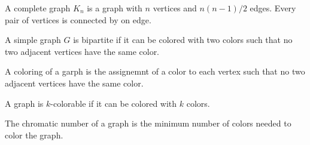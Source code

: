 \documentclass{scrreprt}
\begin{document}
\begin{definition}
    A complete graph $K_n$ is a graph with $n$ vertices and $n(n-1)/2$ edges.
    Every pair of vertices is connected by on edge.
\end{definition}

\begin{definition}
    A simple graph $G$ is bipartite if it can be colored with two colors such that no two adjacent vertices have the same color.
\end{definition}

\begin{definition}
    A coloring of a garph is the assignemnt of a color to each vertex such that no two adjacent vertices have the same color.
    
    A graph is $k$-colorable if it can be colored with $k$ colors.

    The chromatic number of a graph is the minimum number of colors needed to color the graph.
\end{definition}
\end{document}
